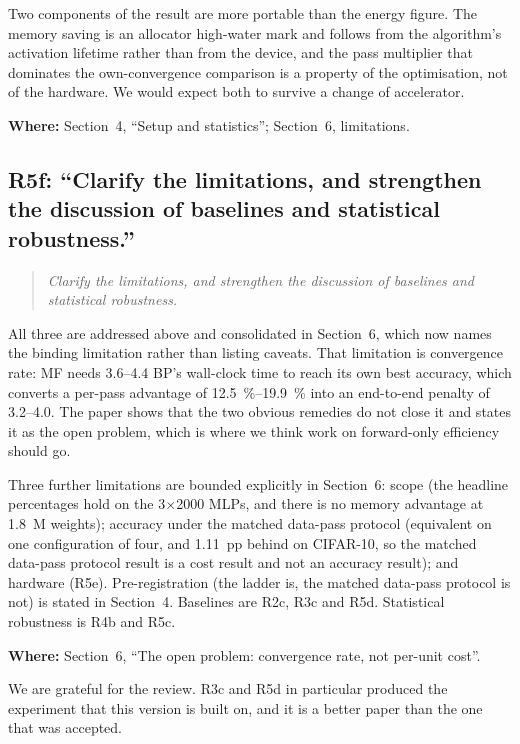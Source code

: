 \documentclass[11pt,a4paper]{article}
\newcommand{\MF}{MF}
\newcommand{\BP}{BP}
\newenvironment{comment}%
  {\begin{quote}\itshape\small}%
  {\end{quote}}
\newcommand{\where}[1]{\par\smallskip\noindent\textbf{Where:} #1\par}
\begin{document}
Two components of the result are more portable than the energy figure. The
memory saving is an allocator high-water mark and follows from the algorithm's
activation lifetime rather than from the device, and the pass multiplier that
dominates the own-convergence comparison is a property of the optimisation,
not of the hardware. We would expect both to survive a change of accelerator.

\where{Section~4, ``Setup and statistics''; Section~6, limitations.}

\subsection*{R5f: ``Clarify the limitations, and strengthen the discussion of
baselines and statistical robustness.''}

\begin{comment}
Clarify the limitations, and strengthen the discussion of baselines and
statistical robustness.
\end{comment}

\noindent
All three are addressed above and consolidated in Section~6, which now names
the binding limitation rather than listing caveats. That limitation is
convergence rate: \MF{} needs \SIrange{3.6}{4.4}{\times} \BP{}'s wall-clock
time to reach its own best accuracy, which converts a per-pass advantage of \SIrange{12.5}{19.9}{\percent} into an end-to-end penalty of
\SIrange{3.2}{4.0}{\times}. The paper shows that the two obvious remedies do
not close it and states it as the open problem, which is where we think work
on forward-only efficiency should go.

Three further limitations are bounded explicitly in Section~6: scope (the
headline percentages hold on the \num{3}$\times$\num{2000} MLPs, and there is
no memory advantage at \num{1.8}~M weights); accuracy under the matched data-pass protocol
(equivalent on one configuration of four, and \num{1.11}~pp behind on
CIFAR-10, so the matched data-pass protocol result is a cost result and not an accuracy
result); and hardware (R5e). Pre-registration (the ladder is, the matched
data-pass protocol is not) is stated in Section~4. Baselines are R2c, R3c and R5d. Statistical robustness is
R4b and R5c.

\where{Section~6, ``The open problem: convergence rate, not per-unit cost''.}

\bigskip
\noindent
We are grateful for the review. R3c and R5d in particular produced the
experiment that this version is built on, and it is a better paper than the one
that was accepted.
\end{document}
